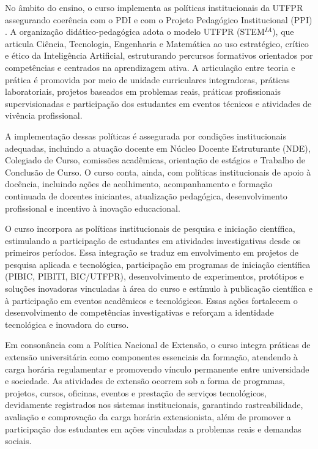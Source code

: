 No âmbito do ensino, o curso implementa as políticas institucionais da UTFPR assegurando coerência com o PDI \cite{UTFPR_PDI_2023} e com o Projeto Pedagógico Institucional (PPI) \cite{UTFPR_PPI_2019}. A organização didático-pedagógica adota o modelo UTFPR (STEM$^{IA}$), que articula Ciência, Tecnologia, Engenharia e Matemática ao uso estratégico, crítico e ético da Inteligência Artificial, estruturando percursos formativos orientados por competências e centrados na aprendizagem ativa. A articulação entre teoria e prática é promovida por meio de unidade curriculares integradoras, práticas laboratoriais, projetos baseados em problemas reais, práticas profissionais supervisionadas e participação dos estudantes em eventos técnicos e atividades de vivência profissional.

A implementação dessas políticas é assegurada por condições institucionais adequadas, incluindo a atuação docente em Núcleo Docente Estruturante (NDE), Colegiado de Curso, comissões acadêmicas, orientação de estágios e Trabalho de Conclusão de Curso. O curso conta, ainda, com políticas institucionais de apoio à docência, incluindo ações de acolhimento, acompanhamento e formação continuada de docentes iniciantes, atualização pedagógica, desenvolvimento profissional e incentivo à inovação educacional.

O curso incorpora as políticas institucionais de pesquisa e iniciação científica, estimulando a participação de estudantes em atividades investigativas desde os primeiros períodos. Essa integração se traduz em envolvimento em projetos de pesquisa aplicada e tecnológica, participação em programas de iniciação científica (PIBIC, PIBITI, BIC/UTFPR), desenvolvimento de experimentos, protótipos e soluções inovadoras vinculadas à área do curso e estímulo à publicação científica e à participação em eventos acadêmicos e tecnológicos. Essas ações fortalecem o desenvolvimento de competências investigativas e reforçam a identidade tecnológica e inovadora do curso.

Em consonância com a Política Nacional de Extensão, o curso integra práticas de extensão universitária como componentes essenciais da formação, atendendo à carga horária regulamentar e promovendo vínculo permanente entre universidade e sociedade. As atividades de extensão ocorrem sob a forma de programas, projetos, cursos, oficinas, eventos e prestação de serviços tecnológicos, devidamente registrados nos sistemas institucionais, garantindo rastreabilidade, avaliação e comprovação da carga horária extensionista, além de promover a participação dos estudantes em ações vinculadas a problemas reais e demandas sociais.

